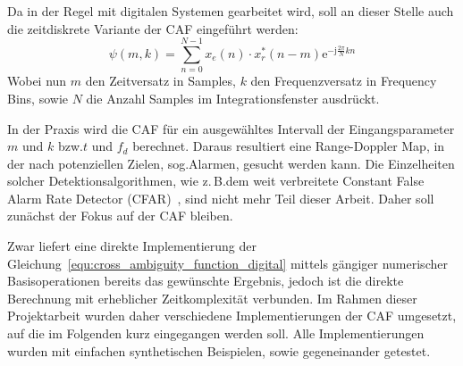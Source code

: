 Da in der Regel mit digitalen Systemen gearbeitet wird, soll an dieser Stelle auch die zeitdiskrete Variante der CAF eingeführt werden:%
%
\begin{equation}\label{equ:cross_ambiguity_function_digital}
    \psi(m, k) = \sum_{n = 0}^{N - 1}{x_{e}(n) \cdot x_{r}^{*}(n - m) \mathrm{e}^{-\mathrm{j} \frac{2 \pi}{N} k n}}
\end{equation}%
%
Wobei nun \(m\) den Zeitversatz in Samples, \(k\) den Frequenzversatz in Frequency Bins, sowie \(N\) die Anzahl Samples im Integrationsfenster ausdrückt.

In der Praxis wird die CAF für ein ausgewähltes Intervall der Eingangsparameter \(m\) und \(k\) bzw.\@ \(t\) und \(f_d\) berechnet. Daraus resultiert eine Range-Doppler Map, in der nach potenziellen Zielen, sog.\@ Alarmen, gesucht werden kann. Die Einzelheiten solcher Detektionsalgorithmen, wie z.\,B.\@ dem weit verbreitete Constant False Alarm Rate Detector (CFAR)~\cite[S.~208--230]{Malanowski2019}, sind nicht mehr Teil dieser Arbeit. Daher soll zunächst der Fokus auf der CAF bleiben.

Zwar liefert eine direkte Implementierung der Gleichung~\ref{equ:cross_ambiguity_function_digital} mittels gängiger numerischer Basisoperationen bereits das gewünschte Ergebnis, jedoch ist die direkte Berechnung mit erheblicher Zeitkomplexität verbunden. Im Rahmen dieser Projektarbeit wurden daher verschiedene Implementierungen der CAF umgesetzt, auf die im Folgenden kurz eingegangen werden soll. Alle Implementierungen wurden mit einfachen synthetischen Beispielen, sowie gegeneinander getestet.

